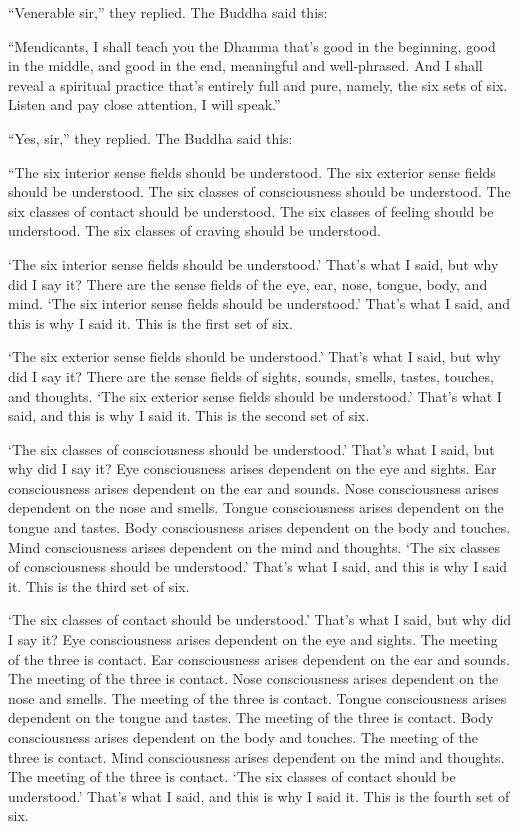\documentclass[12pt,openany]{book}%
\begin{document}
“Venerable sir,” they replied. The Buddha said this: 

“Mendicants, I shall teach you the Dhamma that’s good in the beginning, good in the middle, and good in the end, meaningful and well-phrased. And I shall reveal a spiritual practice that’s entirely full and pure, namely, the six sets of six. Listen and pay close attention, I will speak.” 

“Yes, sir,” they replied. The Buddha said this: 

“The six interior sense fields should be understood. The six exterior sense fields should be understood. The six classes of consciousness should be understood. The six classes of contact should be understood. The six classes of feeling should be understood. The six classes of craving should be understood. 

‘The six interior sense fields should be understood.’ That’s what I said, but why did I say it? There are the sense fields of the eye, ear, nose, tongue, body, and mind. ‘The six interior sense fields should be understood.’ That’s what I said, and this is why I said it. This is the first set of six. 

‘The six exterior sense fields should be understood.’ That’s what I said, but why did I say it? There are the sense fields of sights, sounds, smells, tastes, touches, and thoughts. ‘The six exterior sense fields should be understood.’ That’s what I said, and this is why I said it. This is the second set of six. 

‘The six classes of consciousness should be understood.’ That’s what I said, but why did I say it? Eye consciousness arises dependent on the eye and sights. Ear consciousness arises dependent on the ear and sounds. Nose consciousness arises dependent on the nose and smells. Tongue consciousness arises dependent on the tongue and tastes. Body consciousness arises dependent on the body and touches. Mind consciousness arises dependent on the mind and thoughts. ‘The six classes of consciousness should be understood.’ That’s what I said, and this is why I said it. This is the third set of six. 

‘The six classes of contact should be understood.’ That’s what I said, but why did I say it? Eye consciousness arises dependent on the eye and sights. The meeting of the three is contact. Ear consciousness arises dependent on the ear and sounds. The meeting of the three is contact. Nose consciousness arises dependent on the nose and smells. The meeting of the three is contact. Tongue consciousness arises dependent on the tongue and tastes. The meeting of the three is contact. Body consciousness arises dependent on the body and touches. The meeting of the three is contact. Mind consciousness arises dependent on the mind and thoughts. The meeting of the three is contact. ‘The six classes of contact should be understood.’ That’s what I said, and this is why I said it. This is the fourth set of six. 
\end{document}
